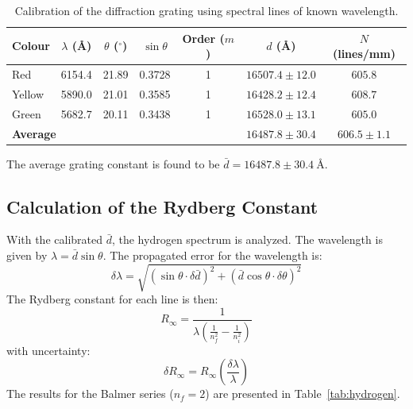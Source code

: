 \documentclass[a4paper,11pt]{article}
\begin{document}
\begin{table}[H]
\centering
\caption{Calibration of the diffraction grating using spectral lines of known wavelength.}
\label{tab:calibration}
\begin{tabular}{lcccccc}
\toprule
Colour & $\lambda$ (\AA) & $\theta$ ($^\circ$) & $\sin\theta$ & Order ($m$) & $d$ (\AA) & $N$ (lines/mm) \\
\midrule
Red & 6154.4 & 21.89 & 0.3728 & 1 & $16507.4 \pm 12.0$ & $605.8$ \\
Yellow & 5890.0 & 21.01 & 0.3585 & 1 & $16428.2 \pm 12.4$ & $608.7$ \\
Green & 5682.7 & 20.11 & 0.3438 & 1 & $16528.0 \pm 13.1$ & $605.0$ \\
\midrule
\multicolumn{5}{l}{\textbf{Average}} & $\mathbf{16487.8 \pm 30.4}$ & $\mathbf{606.5 \pm 1.1}$ \\
\bottomrule
\end{tabular}
\end{table}

The average grating constant is found to be $\bar{d} = 16487.8 \pm 30.4\ \text{\AA}$.

\subsection{Calculation of the Rydberg Constant}
With the calibrated $\bar{d}$, the hydrogen spectrum is analyzed. The wavelength is given by $\lambda = \bar{d} \sin\theta$. The propagated error for the wavelength is:
\begin{equation}
    \delta\lambda = \sqrt{ \left( \sin\theta \cdot \delta\bar{d} \right)^2 + \left( \bar{d} \cos\theta \cdot \delta\theta \right)^2 }
\end{equation}
The Rydberg constant for each line is then:
\begin{equation}
    R_\infty = \frac{1}{\lambda \left( \frac{1}{n_f^2} - \frac{1}{n_i^2} \right)}
\end{equation}
with uncertainty:
\begin{equation}
    \delta R_\infty = R_\infty \left( \frac{\delta\lambda}{\lambda} \right)
\end{equation}
The results for the Balmer series ($n_f = 2$) are presented in Table~\ref{tab:hydrogen}.
\end{document}
